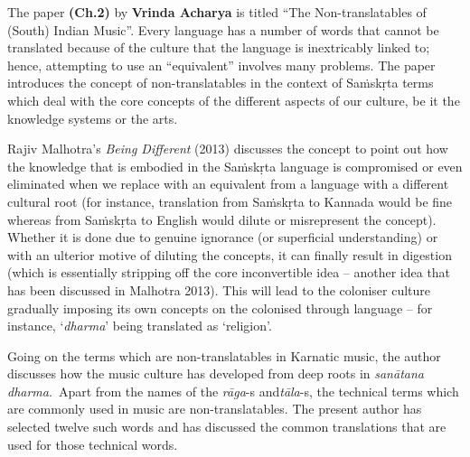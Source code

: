 The paper \textbf{(Ch.2)} by \textbf{Vrinda Acharya} is titled “The Non-translatables of (South) Indian Music”. Every language has a number of words that cannot be translated because of the culture that the language is inextricably linked to; hence, attempting to use an “equivalent” involves many problems. The paper introduces the concept of non-translatables in the context of Saṁskṛta terms which deal with the core concepts of the different aspects of our culture, be it the knowledge systems or the arts.

\newpage

Rajiv Malhotra’s \textit{Being Different} (2013) discusses the concept to point out how the knowledge that is embodied in the Saṁskṛta language is compromised or even eliminated when we replace with an equivalent from a language with a different cultural root (for instance, translation from Saṁskṛta to Kannada would be fine whereas from Saṁskṛta to English would dilute or misrepresent the concept). Whether it is done due to genuine ignorance (or superficial understanding) or with an ulterior motive of diluting the concepts, it can finally result in digestion (which is essentially stripping off the core inconvertible idea – another idea that has been discussed in Malhotra 2013). This will lead to the coloniser culture gradually imposing its own concepts on the colonised through language – for instance, ‘\textit{dharma}’ being translated as ‘religion’.

Going on the terms which are non-translatables in Karnatic music, the author discusses how the music culture has developed from deep roots in \textit{sanātana dharma}.~Apart from the names of the \textit{rāga}-s and\break \textit{tāla}-s, the technical terms which are commonly used in music are non-translatables. The present author has selected twelve such words and has discussed the common translations that are used for those technical words.

